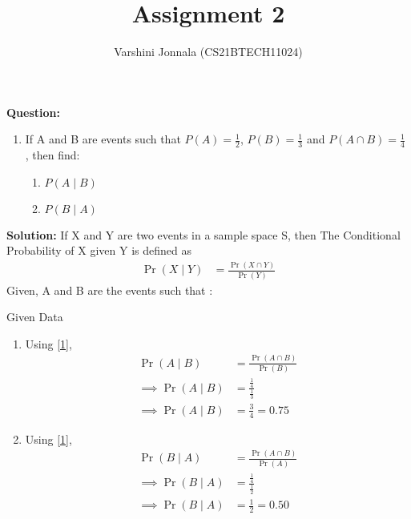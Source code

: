 \documentclass[journal,12pt,twocolumn]{IEEEtran}
\title{Assignment 2}
\author{Varshini Jonnala (CS21BTECH11024)}
\providecommand{\pr}[1]{\ensuremath{\Pr\left(#1\right)}}
\newcommand{\question}{\noindent \textbf{Question: }}
\newcommand{\solution}{\noindent \textbf{Solution: }}
\begin{document}
    \maketitle
    
    \question
    \begin{enumerate}[label=]
        \item  If A and B are events such that $P(A) = \frac{1}{2}$, $P(B)= \frac{1}{3}$ and $P(A \cap B)= \frac{1}{4}$ , then find:
    \begin{enumerate}
        \item $P(A \mid B)$
        \item $P(B \mid A)$
    \end{enumerate}
    \end{enumerate}

    \solution 
     If X and Y are two events in a sample space S,
     then The Conditional Probability of X given Y is defined as
        \begin{align}
        \label{1}  \pr{X \mid Y} &= \frac{\pr{X \cap Y}}{\pr{Y}}  
        \end{align}
        Given, A and B are the events such that :  
        \begin{table}[ht!]
            
        \caption{Given Data}
	        \label{Tables:Table}
        \end{table}
    
        \begin{enumerate}
            \item Using \ref{1},
            \begin{align}
                \pr{A \mid B} &= \frac{\pr{A \cap B}}{\pr{B}}\\
                \implies \pr{A \mid B} &= {\frac{\frac{1}{4}}{\frac{1}{3}}}\\
                \implies \pr{A \mid B} &= \frac{3}{4} = 0.75
            \end{align}
            
            \item Using \ref{1},
                \begin{align}
                \pr{B \mid A} &= \frac{\pr{A \cap B}}{\pr{A}}\\
                \implies \pr{B \mid A} &= {\frac{\frac{1}{4}}{\frac{1}{2}}}\\
                \implies \pr{B \mid A} &= \frac{1}{2} = 0.50
            \end{align} 
        \end{enumerate}
    
\end{document}
